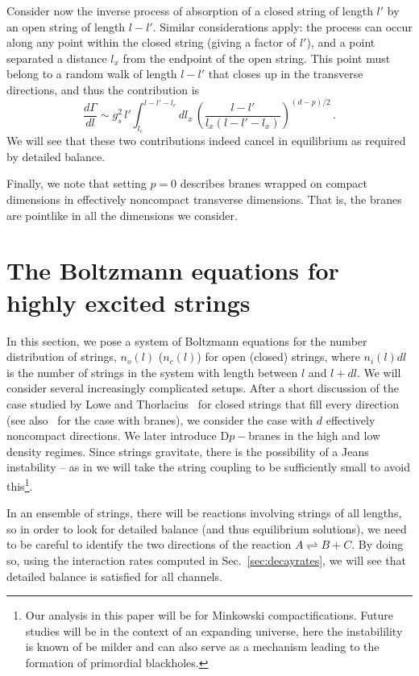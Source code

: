 \documentclass[a4paper,11pt]{article}
\newcommand{\lr}[1]{\left(#1\right)}
\begin{document}
Consider now the inverse process of absorption of a closed string of length $l'$ by an open string of length $l-l'$. 
Similar considerations apply: the process can occur along any point within the closed string (giving a factor of $l'$), and a point separated a distance $l_x$ from the endpoint of the open string.
This point must belong to a random walk of length $l-l'$ that closes up in the transverse directions, and thus the contribution is
\begin{equation}
    \frac{d\Gamma}{dl}\sim g_s^2 \, l'\int_{l_c}^{l-l'-l_c}{dl_x\, \lr{\frac{l-l'}{l_x(l-l'-l_x)}}^{(d-p)/2}} \, .
\end{equation}
We will see that these two contributions indeed cancel in equilibrium as 
required by detailed balance.

Finally, we note that setting $p=0$ describes branes wrapped on compact
dimensions in effectively noncompact transverse dimensions. That is, the branes
are pointlike in all the dimensions we consider.

\section{The Boltzmann equations for highly excited strings}\label{sec:boltzmann}

In this section, we pose a system of Boltzmann equations for the number distribution of strings, $n_o(l)$ ($n_c(l)$) for open (closed) strings, where $n_i(l)dl$ is the number of strings in the system with length between $l$ and $l+dl$.
We will consider several increasingly complicated setups.
After a short discussion of the case studied by Lowe and Thorlacius~\cite{Lowe:1994nm} for closed strings that fill every direction (see also~\cite{Lee:1997iz} for the case with branes), we consider the case with $d$ effectively noncompact directions.
We later introduce D$p-$branes in the high and low density regimes. Since strings gravitate, there is the possibility of a Jeans instability --
as in \cite{Lowe:1994nm, Lee:1997iz} we will take the string coupling to be sufficiently small to avoid this\footnote{Our analysis
in this paper will be for Minkowski compactifications. Future studies will be in the context of an expanding universe, here the instabilility
is known of be milder and can also serve as a mechanism leading to the formation of primordial blackholes.}. 

In an ensemble of strings, there will be reactions involving strings of all lengths, so in order to look for detailed balance (and thus equilibrium solutions), we need to be careful to identify the two directions of the reaction $A\rightleftharpoons B+C$.
By doing so, using the interaction rates computed in Sec.~\ref{sec:decayrates}, we will see that detailed balance is satisfied for all channels.
\end{document}
